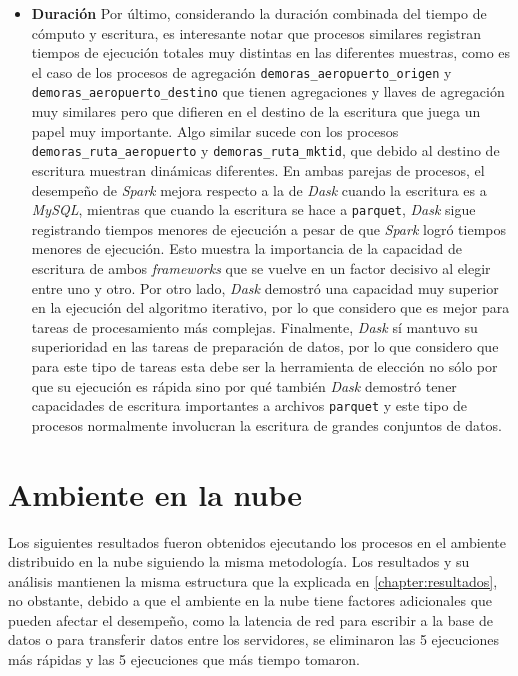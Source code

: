 \begin{itemize}
	\item \textbf{Duración} Por último, considerando la duración combinada del tiempo de cómputo y escritura, es interesante notar que procesos similares registran tiempos de ejecución totales muy distintas en las diferentes muestras, como es el caso de los procesos de agregación \texttt{demoras\_aeropuerto\_origen} y \texttt{demoras\_aeropuerto\_destino} que tienen agregaciones y llaves de agregación muy similares pero que difieren en el destino de la escritura que juega un papel muy importante. Algo similar sucede con los procesos \texttt{demoras\_ruta\_aeropuerto} y \texttt{demoras\_ruta\_mktid}, que debido al destino de escritura muestran dinámicas diferentes. En ambas parejas de procesos, el desempeño de \textit{Spark} mejora respecto a la de \textit{Dask} cuando la escritura es a \textit{MySQL}, mientras que cuando la escritura se hace a \texttt{parquet}, \textit{Dask} sigue registrando tiempos menores de ejecución a pesar de que \textit{Spark} logró tiempos menores de ejecución. Esto muestra la importancia de la capacidad de escritura de ambos \textit{frameworks} que se vuelve en un factor decisivo al elegir entre uno y otro. Por otro lado, \textit{Dask} demostró una capacidad muy superior en la ejecución del algoritmo iterativo, por lo que considero que es mejor para tareas de procesamiento más complejas. Finalmente, \textit{Dask} sí mantuvo su superioridad en las tareas de preparación de datos, por lo que considero que para este tipo de tareas esta debe ser la herramienta de elección no sólo por que su ejecución es rápida sino por qué también \textit{Dask} demostró tener capacidades de escritura importantes a archivos \texttt{parquet} y este tipo de procesos normalmente involucran la escritura de grandes conjuntos de datos. 
	
\end{itemize}


\newpage

\section{Ambiente en la nube}
\label{section:resultados-ambiente-nube}

Los siguientes resultados fueron obtenidos ejecutando los procesos en el ambiente distribuido en la nube siguiendo la misma metodología. Los resultados y su análisis mantienen la misma estructura que la explicada en \ref{chapter:resultados}, no obstante, debido a que el ambiente en la nube tiene factores adicionales que pueden afectar el desempeño, como la latencia de red para escribir a la base de datos o para transferir datos entre los servidores, se eliminaron las 5 ejecuciones más rápidas y las 5 ejecuciones que más tiempo tomaron.

